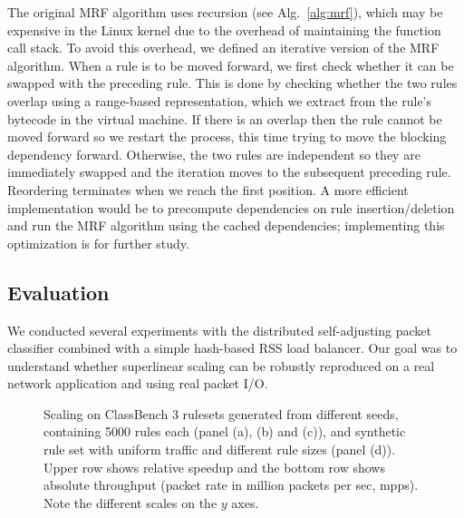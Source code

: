 The original MRF algorithm uses recursion (see Alg.~\ref{alg:mrf}), which may be expensive in the Linux kernel due to the overhead of maintaining the function call stack. To avoid this overhead, we defined an iterative version of the MRF algorithm. When a rule is to be moved forward, we first check whether it can be swapped with the preceding rule. This is done by checking whether the two rules overlap using a range-based representation, which we extract from the rule's bytecode in the \nftables virtual machine. If there is an overlap then the rule cannot be moved forward so we restart the process, this time trying to move the blocking dependency forward. Otherwise, the two rules are independent so they are immediately swapped and the iteration moves to the subsequent preceding rule. Reordering terminates when we reach the first position. A more efficient implementation would be to precompute dependencies on rule insertion\slash deletion and run the MRF algorithm using the cached dependencies; implementing this optimization is for further study. %

\subsection{Evaluation}
\label{sec:sa-nf-tables-eval}

We conducted several experiments with the distributed self-adjusting packet classifier combined with a simple hash-based RSS load balancer. Our goal was to understand whether superlinear scaling can be robustly reproduced on a real network application and using real packet I/O. %

\begin{figure*}[t]
  \centering
  \subfloat[][acl1]{
    
    \label{fig:classbench-acl1}
  }
  \hspace{-1em}
  \subfloat[][ipc1]{
    
    \label{fig:classbench-ipc1}
  }
  \hspace{-1em}
  \subfloat[][fw1]{
    
    \label{fig:classbench-fw1}
  }
  \hspace{-1em}
  \caption{Scaling on ClassBench 3 rulesets generated from different seeds, containing 5000 rules each (panel (a), (b) and (c)), and synthetic rule set with uniform traffic and different rule sizes (panel (d)). Upper row shows relative speedup and the bottom row shows absolute throughput (packet rate in million packets per sec, mpps). Note the different scales on the $y$ axes.}
  \label{fig:classbench}
\end{figure*}


